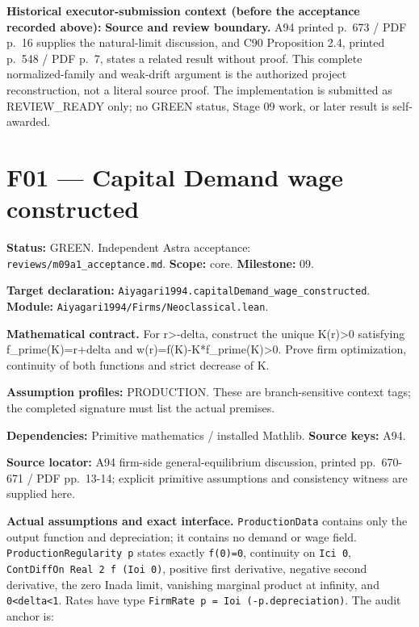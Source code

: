 \documentclass[
  11pt,
]{article}
\let\LedgerOriginalTexttt\texttt
\renewcommand{\texttt}[1]{{\small\LedgerOriginalTexttt{#1}}}
\begin{document}
\textbf{Historical executor-submission context (before the acceptance
recorded above):} \textbf{Source and review boundary.} A94 printed
p.~673 / PDF p.~16 supplies the natural-limit discussion, and C90
Proposition 2.4, printed p.~548 / PDF p.~7, states a related result
without proof. This complete normalized-family and weak-drift argument
is the authorized project reconstruction, not a literal source proof.
The implementation is submitted as REVIEW\_READY only; no GREEN status,
Stage 09 work, or later result is self-awarded.

\section{F01 --- Capital Demand wage
constructed}\label{f01-capital-demand-wage-constructed}

\textbf{Status:} GREEN. Independent Astra acceptance:
\texttt{reviews/m09a1\_acceptance.md}. \textbf{Scope:} core.
\textbf{Milestone:} 09.

\textbf{Target declaration:}
\texttt{Aiyagari1994.capitalDemand\_wage\_constructed}.\\
\textbf{Module:} \texttt{Aiyagari1994/Firms/Neoclassical.lean}.

\textbf{Mathematical contract.} For r\textgreater-delta, construct the
unique K(r)\textgreater0 satisfying f\_prime(K)=r+delta and
w(r)=f(K)-K*f\_prime(K)\textgreater0. Prove firm optimization,
continuity of both functions and strict decrease of K.

\textbf{Assumption profiles:} PRODUCTION. These are branch-sensitive
context tags; the completed signature must list the actual premises.

\textbf{Dependencies:} Primitive mathematics / installed Mathlib.
\textbf{Source keys:} A94.

\textbf{Source locator:} A94 firm-side general-equilibrium discussion,
printed pp.~670-671 / PDF pp.~13-14; explicit primitive assumptions and
consistency witness are supplied here.

\textbf{Actual assumptions and exact interface.} \texttt{ProductionData}
contains only the output function and depreciation; it contains no
demand or wage field. \texttt{ProductionRegularity\ p} states exactly
\texttt{f(0)=0}, continuity on \texttt{Ici\ 0},
\texttt{ContDiffOn\ Real\ 2\ f\ (Ioi\ 0)}, positive first derivative,
negative second derivative, the zero Inada limit, vanishing marginal
product at infinity, and \texttt{0\textless{}delta\textless{}1}. Rates
have type \texttt{FirmRate\ p\ =\ Ioi\ (-p.depreciation)}. The audit
anchor is:
\end{document}

